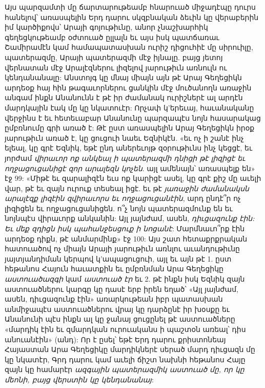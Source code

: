 \documentclass{article}
\begin{document}
{Այս պարզամտի մը ճարտարութեամբ հնարուած միջադէպը դուրս հանելով՝ առասպելին Երդ դարու սկզբնական ձեւին կը վերաբերին իմ կարծիքովս՝ Արայի գոյութիւնը, անոր չնաշխարհիկ գեղեցկութեամբ օժտուած ըլլալն եւ այս իսկ պատճառաւ Շամիրամէն կամ համապատասխան ուրիշ դիցուհիէ մը սիրուիլը, պատերազմը, Արայի պատերազմի մէջ իյնալը. բայց յետոյ վերնատան մէջ Արալէզներու լիզելով յարութիւն առնուլն ու կենդանանալը: Անստոյգ կը մնայ միայն այն թէ Արայ Գեղեցիկն արդեօք հայ հին թագաւորներու ցանկին մէջ մուծանողն առաջին անգամ ինքն Անանունն է թէ իր ժամանակ ուրիշներէ ալ արդէն մարդկային էակ մը կը նկատուէր: Որչափ կ'երեւայ, հաւանականը վերջինս է եւ հետեւաբար Անանունը պարզապէս նոյն հասարակաց ըմբռնումը գրի առած է: Թէ ըստ առասպելին Արայ Գեղեցիկն իրօք յարութիւն առած է, կը ցուցուի նաեւ Եզնիկէն. «եւ ոչ ի շանէ ինչ ելեալ, կը գրէ Եզնիկ, եթէ ընդ աներեւոյթ զօրութիւնս ինչ կեցցէ, եւ յորժամ \emph{վիրաւոր ոք անկեալ ի պատերազմի դնիցի թէ լիզիցէ եւ ողջացուցանիցէ զոր արալեզն կոչեն}. այլ ամենայն՝ առասպելք են» էջ 99: «Միթէ եւ զարալիզէն եւս ոք կարիցէ ասել, կը գրէ քիշ մը աւելի վար, թէ եւ զայն ուրուք տեսեալ իցէ. եւ թէ \emph{յառաջին ժամանակսն արալէզք լիզէին զվիրաւորս եւ ողջացուցանէին}, արդ ընդէ՞ր ոչ լիզիցեն եւ ողջացուցանիցեն. ո՞չ նոյն պատերազմունք են եւ նոյնպէս վիրաւորք անկանին: Այլ յայնժամ, ասեն, \emph{դիւցազունք էին: Եւ մեք զդիցն իսկ պահանջեսցուք ի նոցանէ}: Մարմնաւո՞րք էին արդեօք դիքն, թէ անմարմինք» էջ 100: Այս շատ հետաքրքրական հատուածով ոչ միայն Արայի յարութիւն առնլու աւանդութիւնը յայտյանդիման կերպով կ'ապացուցուի, այլ եւ այն թէ 1. ըստ հեթանոս Հայուն հաւատքին եւ ըմբռնման Արա Գեղեցիկը \emph{աստուածազգի} կամ \emph{աստուած էր} եւ 2. թէ ինքն իսկ Եզնիկ զայն աստուածներու կարգը կը դասէ երբ իրեն եղած՝ «Այլ յայնժամ, ասեն, դիւցազունք էին» առարկութեան իբր պատասխան անմիջապէս աստուածներու վրայ կը դարձընէ իր խօսքը եւ Անանունի պէս ինքն ալ կը ջանայ ցուցընել թէ աստուածները «մարդիկ էին եւ զմարդկան ուրուականս ի պաշտօն առեալ՝ դիս անուանէին» (անդ): Որ է ըսել՝ եթէ Երդ դարու քրիստոնեայ Հայաստան Արա Գեղեցիկը մարդիկներէ սերած մարդ դիւցազն մը կը նկատէր, Գրդ դարու կամ աւելի ճիշտ նախնի հեթանոս Հայը զայն կը համարէր \emph{ազգային պատերազմիկ աստուած մը, որ կը մեոնի, բայց վերստին կը կենդանանայ}:}
\clearpage
\subsection{}
\end{document}

